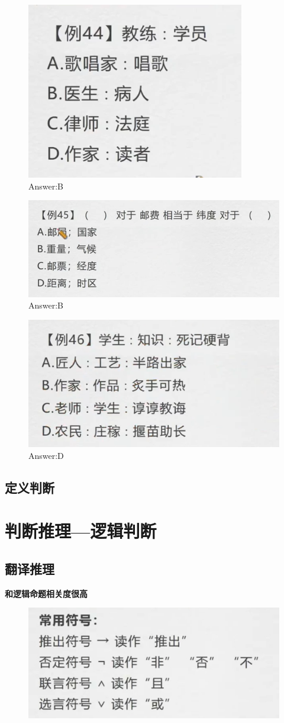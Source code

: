\documentclass{article}
\numberwithin{equation}{section}						%
\numberwithin{figure}{section}							%
\begin{document}
\begin{sloppypar}
\begin{figure}[H]
     \centering
     \includegraphics[width=0.4\linewidth]{144.png}
		\caption{Answer:B}
\end{figure}


\begin{figure}[H]
     \centering
     \includegraphics[width=0.4\linewidth]{145.png}
		\caption{Answer:B}
\end{figure}

\begin{figure}[H]
     \centering
     \includegraphics[width=0.4\linewidth]{146.png}
		\caption{Answer:D}
\end{figure}


\subsection{定义判断}



\section{判断推理---逻辑判断}



\subsection{翻译推理}

\textbf{和逻辑命题相关度很高}

\begin{figure}[H]
     \centering
     \includegraphics[width=0.4\linewidth]{147.png}
\end{figure}


\end{sloppypar}
\end{document}
